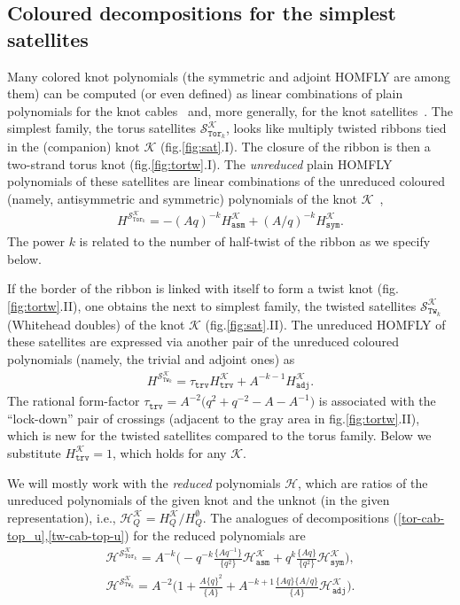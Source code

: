 \documentclass[11pt]{article}
\def\be{\begin{eqnarray}}
\def\ee{\end{eqnarray}}
\def\Hm{\mathcal{H}}
\def\Km{\mathcal{K}}
\def\Sm{\mathcal{S}}
\def\Tor{\mathtt{Tor}}
\def\Tw{\mathtt{Tw}}
\def\sym{\mathtt{sym}}
\def\asm{\mathtt{asm}}
\def\adj{\mathtt{adj}}
\def\trv{\mathtt{trv}}
\begin{document}
\subsection{Coloured decompositions for the simplest satellites}
Many colored knot polynomials (the symmetric and adjoint HOMFLY are among them) can be computed (or even defined) as linear combinations of plain polynomials for the knot cables~\cite{AMcab} and, more generally, for the knot satellites~\cite{KnotBook}. The simplest family, the torus satellites $\Sm_{\Tor_k}^{\Km}$, looks like multiply twisted ribbons tied in the (companion) knot $\Km$ (fig.\ref{fig:sat}.I). The closure of the ribbon is then a two-strand torus knot (fig.\ref{fig:tortw}.I). The \textit{unreduced} plain HOMFLY polynomials of these satellites are linear combinations of the unreduced coloured (namely, antisymmetric and symmetric) polynomials of the knot $\Km$~\cite{AMcab},
\be
H^{\Sm_{\Tor_k}^{\Km}}=-(Aq)^{-k}H^{\Km}_{\asm}+(A/q)^{-k}H^{\Km}_{\sym}.\label{tor-cab-top_u}
\ee
The power $k$ is related to the number of half-twist of the ribbon as we specify below.

If the border of the ribbon is linked with itself to form a twist knot (fig.\ref{fig:tortw}.II), one obtains the next to simplest family, the twisted satellites $\Sm_{\Tw_k}^{\Km}$ (Whitehead doubles) of the knot $\Km$ (fig.\ref{fig:sat}.II). The unreduced HOMFLY of these satellites are expressed via another pair of the unreduced coloured polynomials (namely, the trivial and adjoint ones) as
\be
H^{\Sm_{\Tw_k}^{\Km}}=\tau_{\trv}H^{\Km}_{\trv}+A^{-k-1}H^{\Km}_{\adj}.\label{tw-cab-top-u}
\ee
The rational form-factor $\tau_{\trv}=A^{-2}\Big(q^2+q^{-2}-A-A^{-1}\Big)$ is associated with the ``lock-down'' pair of crossings (adjacent to the gray area in fig.\ref{fig:tortw}.II), which is new for the twisted satellites compared to the torus family.
Below we substitute $H^{\Km}_{\trv}=1$, which holds for any $\Km$. 

We will mostly work with the \textit{reduced} polynomials $\Hm$, which are ratios of the unreduced polynomials of the given knot and the unknot (in the given representation), i.e.,  $\Hm^{\Km}_Q=H^{\Km}_Q/H^{\emptyset}_Q$. The analogues of decompositions (\ref{tor-cab-top_u},\ref{tw-cab-top-u}) for the reduced polynomials are
\be
\Hm^{\Sm_{\Tor_k}^{\Km}}=A^{-k}\Big(-q^{-k}\frac{\{Aq^{-1}\}}{\{q^2\}}\Hm^{\Km}_{\asm}+q^{k}\frac{\{Aq\}}{\{q^2\}}\Hm^{\Km}_{\sym}\Big),
\label{tor-cab-top}
\ee
\be
\Hm^{\Sm_{\Tw_k}^{\Km}}=A^{-2}\Big(1+\frac{A\{q\}^2}{\{A\}}+A^{-k+1}\frac{\{Aq\}\{A/q\}}{\{A\}}\Hm^{\Km}_{\adj}\Big).\label{tw-cab-top}
\ee
\end{document}
